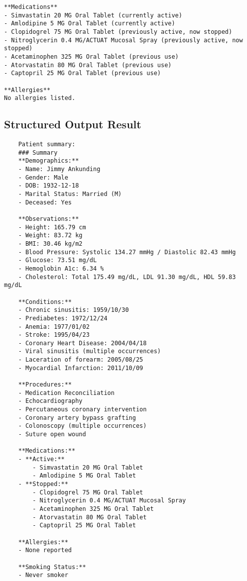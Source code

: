 \begin{lstlisting}
**Medications**
- Simvastatin 20 MG Oral Tablet (currently active)
- Amlodipine 5 MG Oral Tablet (currently active)
- Clopidogrel 75 MG Oral Tablet (previously active, now stopped)
- Nitroglycerin 0.4 MG/ACTUAT Mucosal Spray (previously active, now stopped)
- Acetaminophen 325 MG Oral Tablet (previous use)
- Atorvastatin 80 MG Oral Tablet (previous use)
- Captopril 25 MG Oral Tablet (previous use)

**Allergies**
No allergies listed.

\end{lstlisting}

\break
\subsection{Structured Output Result}
\begin{lstlisting}
    Patient summary:
    ### Summary
    **Demographics:**
    - Name: Jimmy Ankunding
    - Gender: Male
    - DOB: 1932-12-18
    - Marital Status: Married (M)
    - Deceased: Yes
    
    **Observations:**
    - Height: 165.79 cm
    - Weight: 83.72 kg
    - BMI: 30.46 kg/m2
    - Blood Pressure: Systolic 134.27 mmHg / Diastolic 82.43 mmHg
    - Glucose: 73.51 mg/dL
    - Hemoglobin A1c: 6.34 %
    - Cholesterol: Total 175.49 mg/dL, LDL 91.30 mg/dL, HDL 59.83 mg/dL
    
    **Conditions:**
    - Chronic sinusitis: 1959/10/30
    - Prediabetes: 1972/12/24
    - Anemia: 1977/01/02
    - Stroke: 1995/04/23
    - Coronary Heart Disease: 2004/04/18
    - Viral sinusitis (multiple occurrences)
    - Laceration of forearm: 2005/08/25
    - Myocardial Infarction: 2011/10/09
    
    **Procedures:**
    - Medication Reconciliation
    - Echocardiography
    - Percutaneous coronary intervention
    - Coronary artery bypass grafting
    - Colonoscopy (multiple occurrences)
    - Suture open wound
    
    **Medications:**
    - **Active:**
        - Simvastatin 20 MG Oral Tablet
        - Amlodipine 5 MG Oral Tablet
    - **Stopped:**
        - Clopidogrel 75 MG Oral Tablet
        - Nitroglycerin 0.4 MG/ACTUAT Mucosal Spray
        - Acetaminophen 325 MG Oral Tablet
        - Atorvastatin 80 MG Oral Tablet
        - Captopril 25 MG Oral Tablet
    
    **Allergies:**
    - None reported
    
    **Smoking Status:**
    - Never smoker
    

\end{lstlisting}
